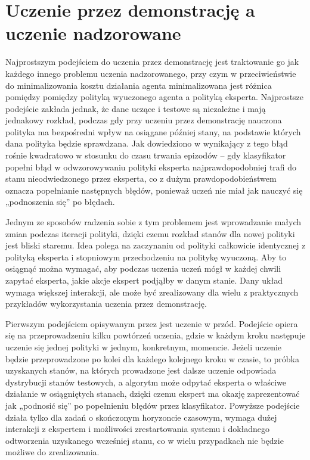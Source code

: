 \section{Uczenie przez demonstrację a uczenie nadzorowane}

Najprostszym podejściem do uczenia przez demonstrację jest traktowanie go jak każdego innego problemu uczenia nadzorowanego, przy czym w przeciwieństwie do minimalizowania kosztu działania agenta minimalizowana jest różnica pomiędzy pomiędzy polityką wyuczonego agenta a polityką eksperta. Najprostsze podejście zakłada jednak, że dane uczące i testowe są niezależne i mają jednakowy rozkład, podczas gdy przy uczeniu przez demonstrację nauczona polityka ma bezpośredni wpływ na osiągane później stany, na podstawie których dana polityka będzie sprawdzana. Jak dowiedziono w \cite{DBLP:journals/corr/abs-1011-0686} wynikający z tego błąd rośnie kwadratowo w stosunku do czasu trwania epizodów – gdy klasyfikator popełni błąd w odwzorowywaniu polityki eksperta najprawdopodobniej trafi do stanu nieodwiedzonego przez eksperta, co z dużym prawdopodobieństwem oznacza popełnianie następnych błędów, ponieważ uczeń nie miał jak nauczyć się „podnoszenia się” po błędach.

Jednym ze sposobów radzenia sobie z tym problemem jest wprowadzanie małych zmian podczas iteracji polityki, dzięki czemu rozkład stanów dla nowej polityki jest bliski staremu. Idea polega na zaczynaniu od polityki całkowicie identycznej z polityką eksperta i stopniowym przechodzeniu na politykę wyuczoną. Aby to osiągnąć można wymagać, aby podczas uczenia uczeń mógł w każdej chwili zapytać eksperta, jakie akcje ekspert podjąłby w danym stanie. Dany układ wymaga większej interakcji, ale może być zrealizowany dla wielu z praktycznych przykładów wykorzystania uczenia przez demonstrację.

Pierwszym podejściem opisywanym przez \cite{DBLP:journals/corr/abs-1011-0686} jest uczenie w przód. Podejście opiera się na przeprowadzeniu kilku powtórzeń uczenia, gdzie w każdym kroku następuje uczenie się jednej polityki w jednym, konkretnym, momencie. Jeżeli uczenie będzie przeprowadzone po kolei dla każdego kolejnego kroku w czasie, to próbka uzyskanych stanów, na których prowadzone jest dalsze uczenie odpowiada dystrybucji stanów testowych, a algorytm może odpytać eksperta o właściwe działanie w osiągniętych stanach, dzięki czemu ekspert ma okazję zaprezentować jak „podnosić się” po popełnieniu błędów przez klasyfikator. Powyższe podejście działa tylko dla zadań o skończonym horyzoncie czasowym, wymaga dużej interakcji z ekspertem i możliwości zrestartowania systemu i dokładnego odtworzenia uzyskanego wcześniej stanu, co w wielu przypadkach nie będzie możliwe do zrealizowania.

